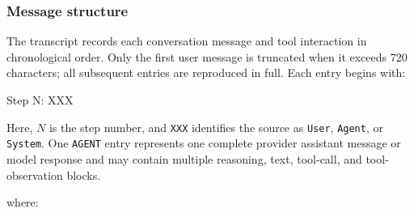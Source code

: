 \documentclass[11pt]{article}
\begin{document}
\subsubsection*{Message structure}
The transcript records each conversation message and tool interaction in chronological order.
Only the first user message is truncated when it exceeds 720 characters; all subsequent entries are reproduced in full.
Each entry begins with:
\begin{DocCode}
Step N: XXX
\end{DocCode}
Here, \(N\) is the step number, and \texttt{XXX} identifies the source as \texttt{User}, \texttt{Agent}, or \texttt{System}.
One \texttt{AGENT} entry represents one complete provider assistant message or model response and may contain multiple reasoning, text, tool-call, and tool-observation blocks.
where:
\end{document}
